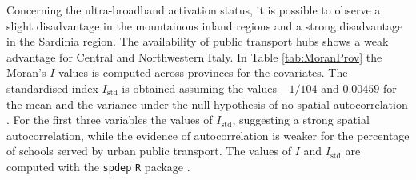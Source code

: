 \documentclass{book}
\begin{document}
Concerning the ultra-broadband activation status, it is possible to observe a slight disadvantage in the mountainous inland regions and a strong disadvantage in the Sardinia region. The availability of public transport hubs shows a weak advantage for Central and Northwestern Italy.
In Table \ref{tab:MoranProv} the Moran's $I$ values is computed across provinces for the covariates. The standardised index $I_\mathrm{std}$ is obtained assuming the values $-1/104$ and $0.00459$ for the mean and the variance under the null hypothesis of no spatial autocorrelation \citep{Cliff_Ord}. For the first three variables the values of $I_\mathrm{std}$, suggesting a strong spatial autocorrelation, while the evidence of autocorrelation is weaker for the percentage of schools served by urban public transport.
The values of $I$ and $I_\mathrm{std}$ are computed with the \texttt{spdep} \texttt{R} package \citep{spdep}. 
\end{document}
